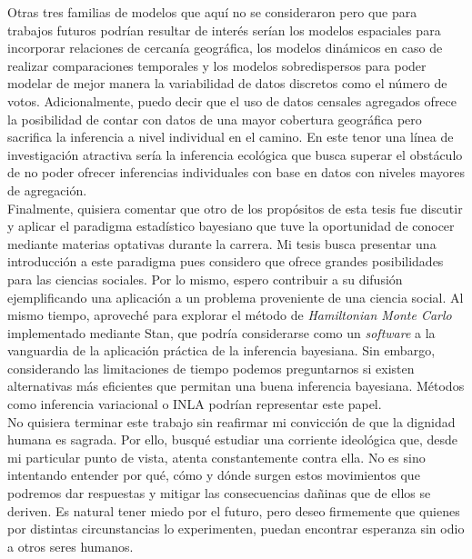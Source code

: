 Otras tres familias de modelos que aquí no se consideraron pero que para trabajos futuros podrían resultar de interés serían los modelos espaciales para incorporar relaciones de cercanía geográfica, los modelos dinámicos en caso de realizar comparaciones temporales y los modelos sobredispersos para poder modelar de mejor manera la variabilidad de datos discretos como el número de votos. Adicionalmente, puedo decir que el uso de datos censales agregados ofrece la posibilidad de contar con datos de una mayor cobertura geográfica pero sacrifica la inferencia a nivel individual en el camino. En este tenor una línea de investigación atractiva sería la inferencia ecológica que busca superar el obstáculo de no poder ofrecer inferencias individuales con base en datos con niveles mayores de agregación.\\

Finalmente, quisiera comentar que otro de los propósitos de esta tesis fue discutir y aplicar el paradigma estadístico bayesiano que tuve la oportunidad de conocer mediante materias optativas durante la carrera. Mi tesis busca presentar una introducción a este paradigma pues considero que ofrece grandes posibilidades para las ciencias sociales. Por lo mismo, espero contribuir a su difusión ejemplificando una aplicación a un problema proveniente de una ciencia social. Al mismo tiempo, aproveché para explorar el método de \textit{Hamiltonian Monte Carlo} implementado mediante Stan, que podría considerarse como un \textit{software} a la vanguardia de la aplicación práctica de la inferencia bayesiana. Sin embargo, considerando las limitaciones de tiempo podemos preguntarnos si existen alternativas más eficientes que permitan una buena inferencia bayesiana. Métodos como inferencia variacional o INLA podrían representar este papel.\\

No quisiera terminar este trabajo sin reafirmar mi convicción de que la dignidad humana es sagrada. Por ello, busqué estudiar una corriente ideológica que, desde mi particular punto de vista, atenta constantemente contra ella. No es sino intentando entender por qué, cómo y dónde surgen estos movimientos que podremos dar respuestas y mitigar las consecuencias dañinas que de ellos se deriven. Es natural tener miedo por el futuro, pero deseo firmemente que quienes por distintas circunstancias lo experimenten, puedan encontrar esperanza sin odio a otros seres humanos.
 
 

